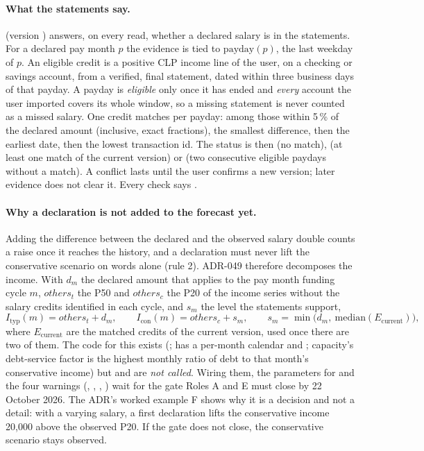 \paragraph{What the statements say.}  (version ) answers,
on every read, whether a declared salary is in the statements. For a declared pay month $p$ the evidence is tied to
$\mathrm{payday}(p)$, the last weekday of $p$. An eligible credit is a positive CLP income line of the user, on a
checking or savings account, from a verified, final statement, dated within three business days of that payday. A
payday is \emph{eligible} only once it has ended and \emph{every} account the user imported covers its whole window, so
a missing statement is never counted as a missed salary. One credit matches per payday: among those within 5\,\% of the
declared amount (inclusive, exact fractions), the smallest difference, then the earliest date, then the lowest
transaction id. The status is then  (no match),  (at least one match of the current
version) or  (two consecutive eligible paydays without a match). A conflict lasts until the user confirms
a new version; later evidence does not clear it. Every check says .

\paragraph{Why a declaration is not added to the forecast yet.} Adding the difference between the declared and the
observed salary double counts a raise once it reaches the history, and a declaration must never lift the conservative
scenario on words alone (rule 2). ADR-049 therefore decomposes the income. With $d_m$ the declared amount that applies
to the pay month funding cycle $m$, $\mathit{others}_{t}$ the P50 and $\mathit{others}_{c}$ the P20 of the income series
without the salary credits identified in each cycle, and $s_m$ the level the statements support,
\begin{equation}
  I_{\mathrm{typ}}(m) = \mathit{others}_t + d_m, \qquad I_{\mathrm{con}}(m) = \mathit{others}_c + s_m, \qquad s_m = \min\bigl(d_m,\ \mathrm{median}(E_{\mathrm{current}})\bigr),
\end{equation}
where $E_{\mathrm{current}}$ are the matched credits of the current version, used once there are two of them. The code
for this exists (;  has a per-month calendar and
; capacity's debt-service factor is the highest monthly ratio of debt to that month's conservative
income) but  and  are \emph{not called}. Wiring them, the parameters
for  and the four warnings (, , ,
) wait for the gate Roles A and E must close by 22 October 2026. The ADR's worked example F
shows why it is a decision and not a detail: with a varying salary, a first declaration lifts the conservative income
20{,}000 above the observed P20. If the gate does not close, the conservative scenario stays observed.

